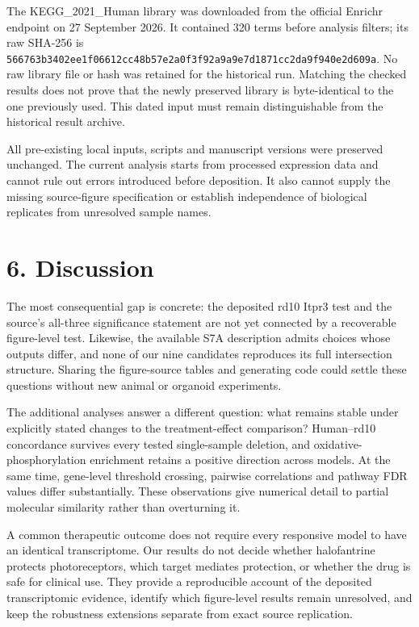 \documentclass[a4paper,10pt]{article}
\begin{document}
The KEGG\_2021\_Human library was downloaded from the official Enrichr endpoint on 27 September 2026. It contained 320 terms before analysis filters; its raw SHA-256 is \nolinkurl{566763b3402ee1f06612cc48b57e2a0f3f92a9a9e7d1871cc2da9f940e2d609a}. No raw library file or hash was retained for the historical run. Matching the checked results does not prove that the newly preserved library is byte-identical to the one previously used. This dated input must remain distinguishable from the historical result archive.

All pre-existing local inputs, scripts and manuscript versions were preserved unchanged. The current analysis starts from processed expression data and cannot rule out errors introduced before deposition. It also cannot supply the missing source-figure specification or establish independence of biological replicates from unresolved sample names.

\section*{6. Discussion}
The most consequential gap is concrete: the deposited rd10 Itpr3 test and the source's all-three significance statement are not yet connected by a recoverable figure-level test. Likewise, the available S7A description admits choices whose outputs differ, and none of our nine candidates reproduces its full intersection structure. Sharing the figure-source tables and generating code could settle these questions without new animal or organoid experiments.

The additional analyses answer a different question: what remains stable under explicitly stated changes to the treatment-effect comparison? Human–rd10 concordance survives every tested single-sample deletion, and oxidative-phosphorylation enrichment retains a positive direction across models. At the same time, gene-level threshold crossing, pairwise correlations and pathway FDR values differ substantially. These observations give numerical detail to partial molecular similarity rather than overturning it.

A common therapeutic outcome does not require every responsive model to have an identical transcriptome. Our results do not decide whether halofantrine protects photoreceptors, which target mediates protection, or whether the drug is safe for clinical use. They provide a reproducible account of the deposited transcriptomic evidence, identify which figure-level results remain unresolved, and keep the robustness extensions separate from exact source replication.
\end{document}

